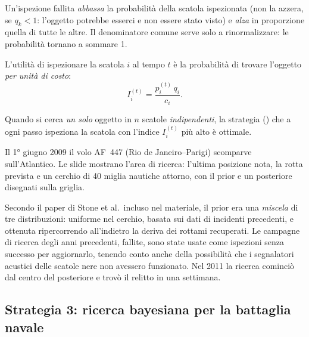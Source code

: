 \begin{osservazione}
Un'ispezione fallita \emph{abbassa} la probabilità della scatola ispezionata (non la
azzera, se $q_k < 1$: l'oggetto potrebbe esserci e non essere stato visto) e
\emph{alza} in proporzione quella di tutte le altre. Il denominatore comune serve solo a
rinormalizzare: le probabilità tornano a sommare 1.
\end{osservazione}

\begin{definizione}
L'utilità di ispezionare la scatola $i$ al tempo $t$ è la probabilità di trovare l'oggetto
\emph{per unità di costo}:
\[
  I_i^{(t)} = \frac{p_i^{(t)}\, q_i}{c_i}.
\]
\end{definizione}

\begin{teorema}
Quando si cerca \emph{un solo} oggetto in $n$ scatole \emph{indipendenti}, la strategia
 () che a ogni passo ispeziona la scatola con l'indice $I_i^{(t)}$
più alto è ottimale.
\end{teorema}

\begin{esempio}
Il 1° giugno 2009 il volo AF~447 (Rio de Janeiro--Parigi) scomparve sull'Atlantico. Le
slide mostrano l'area di ricerca: l'ultima posizione nota, la rotta prevista e un cerchio
di 40 miglia nautiche attorno, con il prior e un posteriore disegnati sulla griglia.

Secondo il paper di Stone et al.\ incluso nel materiale, il prior era una
\emph{miscela} di tre distribuzioni: uniforme nel cerchio, basata sui dati di incidenti
precedenti, e ottenuta ripercorrendo all'indietro la deriva dei rottami recuperati. Le
campagne di ricerca degli anni precedenti, fallite, sono state usate come ispezioni senza
successo per aggiornarlo, tenendo conto anche della possibilità che i segnalatori acustici
delle scatole nere non avessero funzionato. Nel 2011 la ricerca cominciò dal centro del
posteriore e trovò il relitto in una settimana.
\end{esempio}

\subsection{Strategia 3: ricerca bayesiana per la battaglia navale}

